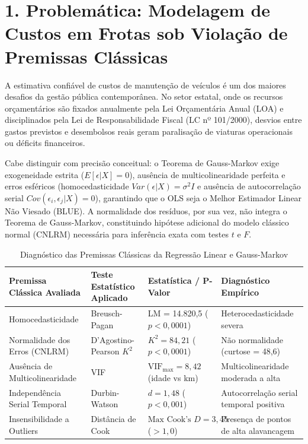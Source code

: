 \documentclass[10pt,a4paper,journal]{article}
\begin{document}
\begin{abstract}
\vspace{0.3cm}
\noindent\textbf{Palavras-chave:} Regressão Linear Robusta; M-Estimador de Huber; Regressão Quantílica; Regularização L1 e L2; Gestão de Frotas Públicas; Auditoria Governamental; Gauss-Markov.
\end{abstract}

\section{1. Problemática: Modelagem de Custos em Frotas sob Violação de Premissas Clássicas}
A estimativa confiável de custos de manutenção de veículos é um dos maiores desafios da gestão pública contemporânea. No setor estatal, onde os recursos orçamentários são fixados anualmente pela Lei Orçamentária Anual (LOA) e disciplinados pela Lei de Responsabilidade Fiscal (LC nº 101/2000), desvios entre gastos previstos e desembolsos reais geram paralisação de viaturas operacionais ou déficits financeiros.

Cabe distinguir com precisão conceitual: o Teorema de Gauss-Markov exige exogeneidade estrita ($E[\epsilon|X]=0$), ausência de multicolinearidade perfeita e erros esféricos (homocedasticidade $Var(\epsilon|X)=\sigma^2 I$ e ausência de autocorrelação serial $Cov(\epsilon_i, \epsilon_j|X)=0$), garantindo que o OLS seja o Melhor Estimador Linear Não Viesado (BLUE). A normalidade dos resíduos, por sua vez, não integra o Teorema de Gauss-Markov, constituindo hipótese adicional do modelo clássico normal (CNLRM) necessária para inferência exata com testes $t$ e $F$.

\begin{table}[htbp]
\centering
\small
\caption{Diagnóstico das Premissas Clássicas da Regressão Linear e Gauss-Markov}
\begin{tabular}{llll}
\toprule
Premissa Clássica Avaliada & Teste Estatístico Aplicado & Estatística / P-Valor & Diagnóstico Empírico \\
\midrule
Homocedasticidade & Breusch-Pagan & LM = 14.820,5 ($p < 0,0001$) & Heterocedasticidade severa \\
Normalidade dos Erros (CNLRM) & D'Agostino-Pearson $K^2$ & $K^2 = 84,21$ ($p < 0,0001$) & Não normalidade (curtose = 48,6) \\
Ausência de Multicolinearidade & VIF & $\text{VIF}_{\max} = 8,42$ (idade vs km) & Multicolinearidade moderada a alta \\
Independência Serial Temporal & Durbin-Watson & $d = 1,48$ ($p < 0,001$) & Autocorrelação serial temporal positiva \\
Insensibilidade a Outliers & Distância de Cook & $\text{Max Cook's } D = 3,45$ ($> 1,0$) & Presença de pontos de alta alavancagem \\
\bottomrule
\end{tabular}
\end{table}
\end{document}
